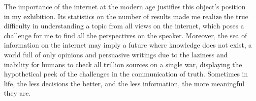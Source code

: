 \documentclass[a4paper,11pt]{article}
\begin{document}

The importance of the internet at the modern age justifies this object's position in my exhibition. Its statistics on the number of results made me realize the true difficulty in understanding a topic from all views on the internet, which poses a challenge for me to find all the perspectives on the speaker. Moreover, the sea of information on the internet may imply a future where knowledge does not exist, a world full of only opinions and persuasive writings due to the laziness and inability for humans to check all trillion sources on a single war, displaying the hypothetical peek of the challenges in the communication of truth. Sometimes in life, the less decisions the better, and the less information, the more meaningful they are.




\nocite{*}
\printbibliography
\end{document}
